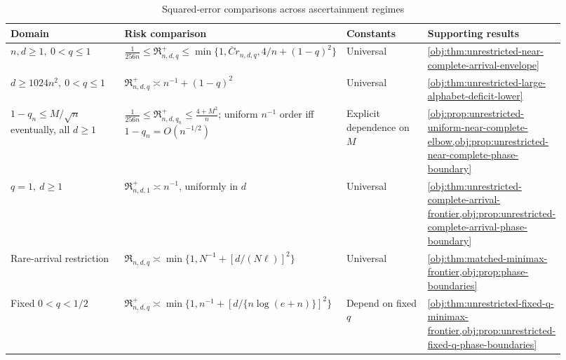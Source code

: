 \begin{table}[htbp]
\centering
\small
\caption{Squared-error comparisons across ascertainment regimes}
\begin{tabular}{p{0.22\linewidth}p{0.31\linewidth}p{0.18\linewidth}p{0.21\linewidth}}
\hline
Domain & Risk comparison & Constants & Supporting results \\
\hline
\(n,d\ge1,\ 0<q\le1\)
&
\(\displaystyle \frac1{256n}\le\mathfrak R^+_{n,d,q}
\le\min\{1,\overline C r_{n,d,q},4/n+(1-q)^2\}\)
&
Universal
&
\cref{obj:thm:unrestricted-near-complete-arrival-envelope}
\\[4pt]
\(d\ge1024n^2,\ 0<q\le1\)
&
\(\mathfrak R^+_{n,d,q}\asymp n^{-1}+(1-q)^2\)
&
Universal
&
\cref{obj:thm:unrestricted-large-alphabet-deficit-lower}
\\[4pt]
\(1-q_n\le M/\sqrt n\) eventually, all \(d\ge1\)
&
\(\displaystyle \frac1{256n}\le\mathfrak R^+_{n,d,q_n}\le\frac{4+M^2}{n}\); uniform \(n^{-1}\) order iff \(1-q_n=O(n^{-1/2})\)
&
Explicit dependence on \(M\)
&
\cref{obj:prop:unrestricted-uniform-near-complete-elbow,obj:prop:unrestricted-near-complete-phase-boundary}
\\[4pt]
\(q=1,\ d\ge1\)
&
\(\mathfrak R^+_{n,d,1}\asymp n^{-1}\), uniformly in \(d\)
&
Universal
&
\cref{obj:thm:unrestricted-complete-arrival-frontier,obj:prop:unrestricted-complete-arrival-phase-boundary}
\\[4pt]
Rare-arrival restriction
&
\(\displaystyle \mathfrak R_{n,d,q}\asymp
\min\{1,N^{-1}+[d/(N\ell)]^2\}\)
&
Universal
&
\cref{obj:thm:matched-minimax-frontier,obj:prop:phase-boundaries}
\\[4pt]
Fixed \(0<q<1/2\)
&
\(\displaystyle \mathfrak R^+_{n,d,q}\asymp
\min\{1,n^{-1}+[d/\{n\log(e+n)\}]^2\}\)
&
Depend on fixed \(q\)
&
\cref{obj:thm:unrestricted-fixed-q-minimax-frontier,obj:prop:unrestricted-fixed-q-phase-boundaries}
\\
\hline
\end{tabular}
\end{table}
